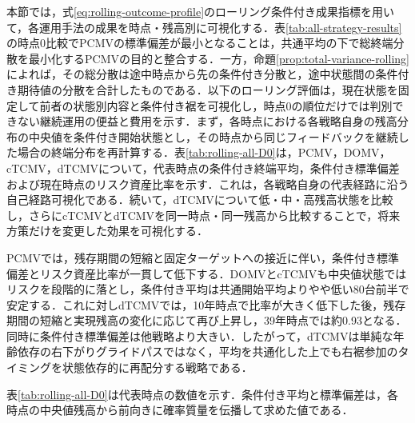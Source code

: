 \documentclass[10pt,a4paper]{article}
\theoremstyle{plain}
\theoremstyle{definition}
\begin{document}
本節では，式\eqref{eq:rolling-outcome-profile}のローリング条件付き成果指標を用いて，各運用手法の成果を時点・残高別に可視化する．表\ref{tab:all-strategy-results}の時点0比較でPCMVの標準偏差が最小となることは，共通平均の下で総終端分散を最小化するPCMVの目的と整合する．一方，命題\ref{prop:total-variance-rolling}によれば，その総分散は途中時点から先の条件付き分散と，途中状態間の条件付き期待値の分散を合計したものである．以下のローリング評価は，現在状態を固定して前者の状態別内容と条件付き裾を可視化し，時点0の順位だけでは判別できない継続運用の便益と費用を示す．まず，各時点における各戦略自身の残高分布の中央値を条件付き開始状態とし，その時点から同じフィードバックを継続した場合の終端分布を再計算する．表\ref{tab:rolling-all-D0}は，PCMV，DOMV，cTCMV，dTCMVについて，代表時点の条件付き終端平均，条件付き標準偏差および現在時点のリスク資産比率を示す．これは，各戦略自身の代表経路に沿う自己経路可視化である．続いて，dTCMVについて低・中・高残高状態を比較し，さらにcTCMVとdTCMVを同一時点・同一残高から比較することで，将来方策だけを変更した効果を可視化する．

PCMVでは，残存期間の短縮と固定ターゲットへの接近に伴い，条件付き標準偏差とリスク資産比率が一貫して低下する．DOMVとcTCMVも中央値状態ではリスクを段階的に落とし，条件付き平均は共通開始平均よりやや低い80台前半で安定する．これに対しdTCMVでは，10年時点で比率が大きく低下した後，残存期間の短縮と実現残高の変化に応じて再び上昇し，39年時点では約0.93となる．同時に条件付き標準偏差は他戦略より大きい．したがって，dTCMVは単純な年齢依存の右下がりグライドパスではなく，平均を共通化した上でも右裾参加のタイミングを状態依存的に再配分する戦略である．

表\ref{tab:rolling-all-D0}は代表時点の数値を示す．条件付き平均と標準偏差は，各時点の中央値残高から前向きに確率質量を伝播して求めた値である．
\end{document}

